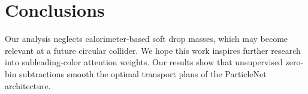 \section{Conclusions}\label{sec:conclusions}

Our analysis neglects calorimeter-based soft drop masses, which may
become relevant at a future circular collider. We hope this work
inspires further research into subleading-color attention weights. Our
results show that unsupervised zero-bin subtractions smooth the optimal
transport plans of the ParticleNet architecture.

